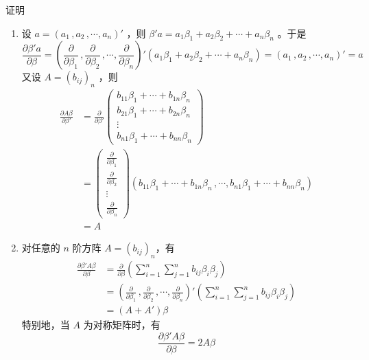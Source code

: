 \documentclass[12pt,hyperref,]{ctexart}
\begin{document}
\heiti

证明

\songti

\begin{enumerate}
\def\labelenumi{(\arabic{enumi})}
\item
  设 \(a=(a_1\, ,a_2\, ,\cdots ,a_n)'\) ，则
  \(\beta'a=a_1\beta_1+a_2\beta_2+\cdots +a_n\beta_n\) 。于是
  \begin{equation*}
  \frac{\partial \beta' a}{\partial \beta}=\left(\frac{\partial}{\partial \beta_1}\, ,\frac{\partial}{\partial \beta_2}\, ,\cdots ,\frac{\partial}{\partial \beta_n}\right)'(a_1\beta_1+a_2\beta_2+\cdots +a_n\beta_n)=(a_1\, ,a_2\, ,\cdots ,a_n)'=a
  \end{equation*}又设 \(A=(b_{ij})_n\) ，则 \begin{equation*}
  \begin{aligned}
  \frac{\partial A\beta}{\partial \beta'} & = \frac{\partial}{\partial \beta'}
  \begin{pmatrix}
  b_{11}\beta_1+\cdots +b_{1n}\beta_n \\
  b_{21}\beta_1+\cdots +b_{2n}\beta_n \\
  \vdots \\
  b_{n1}\beta_1+\cdots +b_{nn}\beta_n 
  \end{pmatrix}\\
  & = 
  \begin{pmatrix}
  \frac{\partial}{\partial \beta_1} \\
  \frac{\partial}{\partial \beta_2} \\
  \vdots \\
  \frac{\partial}{\partial \beta_n}
  \end{pmatrix} (b_{11}\beta_1+\cdots +b_{1n}\beta_n\, ,\cdots , b_{n1}\beta_1+\cdots +b_{nn}\beta_n ) \\
  & = A
  \end{aligned}
  \end{equation*}
\item
  对任意的 \(n\) 阶方阵 \(A=(b_{ij})_n\)，有 \begin{equation*}
  \begin{aligned}
  \frac{\partial \beta' A\beta}{\partial \beta}&=\frac{\partial}{\partial \beta}\left(\sum_{i=1}^{n}\sum_{j=1}^{n}b_{ij}\beta_i\beta_j\right) \\
  &=\left(\frac{\partial}{\partial \beta_1}\, ,\frac{\partial}{\partial \beta_2}\, ,\cdots ,\frac{\partial}{\partial \beta_n}\right)'\left(\sum_{i=1}^{n}\sum_{j=1}^{n}b_{ij}\beta_i\beta_j\right) \\
  & = (A+A')\beta
  \end{aligned}
  \end{equation*}特别地，当 \(A\) 为对称矩阵时，有 \begin{equation*}
  \frac{\partial \beta' A\beta}{\partial \beta}=2A\beta
  \end{equation*}
\end{enumerate}
\end{document}
